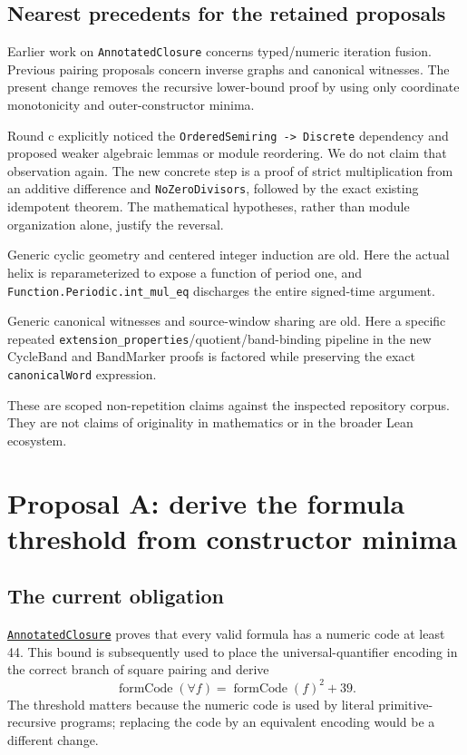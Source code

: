 \documentclass[11pt,letterpaper]{article}
\newcommand{\code}[1]{\nolinkurl{#1}}
\newcommand{\src}[2]{\href{https://github.com/VladimirReshetnikov/ProveIt/blob/1e2a853935a6155cbcf2aa199aaca51946c4fff9/Computability/DiophantineConsistency/Lean/DiophantineConsistency/#1.lean}{\nolinkurl{#2}}}
\begin{document}
\subsection{Nearest precedents for the retained proposals}
\begin{description}[leftmargin=1.8em,style=nextline]
\item[A: constructor minima.] Earlier work on \code{AnnotatedClosure} concerns typed/numeric iteration fusion. Previous pairing proposals concern inverse graphs and canonical witnesses. The present change removes the recursive lower-bound proof by using only coordinate monotonicity and outer-constructor minima.
\item[B: cancellation before discreteness.] Round c explicitly noticed the \code{OrderedSemiring -> Discrete} dependency and proposed weaker algebraic lemmas or module reordering. We do not claim that observation again. The new concrete step is a proof of strict multiplication from an additive difference and \code{NoZeroDivisors}, followed by the exact existing idempotent theorem. The mathematical hypotheses, rather than module organization alone, justify the reversal.
\item[C: period-one rigidity.] Generic cyclic geometry and centered integer induction are old. Here the actual helix is reparameterized to expose a function of period one, and \code{Function.Periodic.int_mul_eq} discharges the entire signed-time argument.
\item[D: exact quotient reuse.] Generic canonical witnesses and source-window sharing are old. Here a specific repeated \code{extension_properties}/quotient/band-binding pipeline in the new CycleBand and BandMarker proofs is factored while preserving the exact \code{canonicalWord} expression.
\end{description}
These are scoped non-repetition claims against the inspected repository corpus. They are not claims of originality in mathematics or in the broader Lean ecosystem.

\section{Proposal A: derive the formula threshold from constructor minima}
\subsection{The current obligation}
\src{AnnotatedClosure}{AnnotatedClosure} proves that every valid formula has a numeric code at least 44. This bound is subsequently used to place the universal-quantifier encoding in the correct branch of square pairing and derive
\[
  \operatorname{formCode}(\forall f)=\operatorname{formCode}(f)^2+39.
\]
The threshold matters because the numeric code is used by literal primitive-recursive programs; replacing the code by an equivalent encoding would be a different change.
\end{document}
